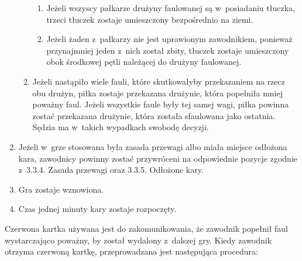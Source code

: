 \documentclass[12pt,a4paper]{article}
\renewcommand{\paragraph}[1]{
  \oldparagraph{#1}%
  \leftskip2.8cm
}
\begin{document}
\begin{enumerate}
\begin{enumerate}
		            \begin{enumerate}
			            \item
			                  Jeżeli wszyscy pałkarze drużyny faulowanej są w~posiadaniu
			                  tłuczka, trzeci tłuczek zostaje umieszczony bezpośrednio na ziemi.
			            \item
			                  Jeżeli żaden z~pałkarzy nie jest uprawionym zawodnikiem, ponieważ
			                  przynajmniej jeden z~nich został zbity, tłuczek zostaje
			                  umieszczony obok środkowej pętli należącej do drużyny faulowanej.
		            \end{enumerate}
		      \item
		            Jeżeli nastąpiło wiele fauli, które skutkowałyby przekazaniem na
		            rzecz obu drużyn, piłka zostaje przekazana drużynie, która popełniła
		            mniej poważny faul. Jeżeli wszystkie faule były tej samej wagi,
		            piłka powinna zostać przekazana drużynie, która została sfaulowana
		            jako ostatnia. Sędzia ma w~takich wypadkach swobodę decyzji.
	      \end{enumerate}
	\item
	      Jeżeli w~grze stosowana była zasada przewagi albo miała miejsce
	      odłożona kara, zawodnicy powinny zostać przywróceni na odpowiednie
	      pozycje zgodnie z~3.3.4. Zasada przewagi oraz 3.3.5. Odłożone kary.
	\item
	      Gra zostaje wznowiona.
	\item
	      Czas jednej minuty kary zostaje rozpoczęty.
\end{enumerate}

\paragraph{Czerwona kartka}
Czerwona kartka używana jest do
zakomunikowania, że zawodnik popełnił faul wystarczająco poważny, by
został wydalony z~dalszej gry. Kiedy zawodnik otrzyma czerwoną kartkę,
przeprowadzana jest następująca procedura:
\end{document}
